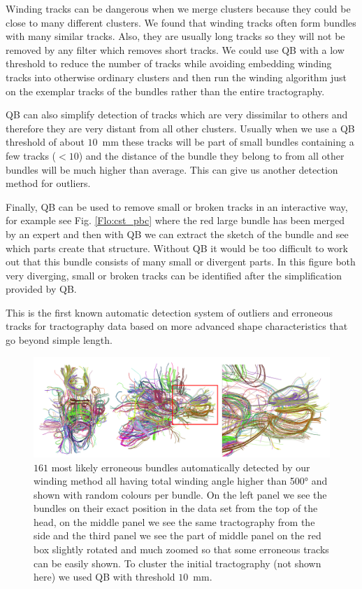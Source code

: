 \documentclass[preprint,authoryear,a4paper,10pt,onecolumn]{elsarticle}
\begin{document}
Winding tracks can be dangerous when we merge clusters because they
could be close to many different clusters. We found that winding tracks
often form bundles with many similar tracks. Also, they are usually long
tracks so they will not be removed by any filter which removes short
tracks. We could use QB with a low threshold to reduce the number of
tracks while avoiding embedding winding tracks into otherwise ordinary
clusters and then run the winding algorithm just on the exemplar tracks
of the bundles rather than the entire tractography.

QB can also simplify detection of tracks which are very dissimilar to
others and therefore they are very distant from all other clusters.
Usually when we use a QB threshold of about $10$~mm these tracks will be
part of small bundles containing a few tracks ($<10$) and the distance
of the bundle they belong to from all other bundles will be much higher
than average. This can give us another detection method for outliers.

Finally, QB can be used to remove small or broken tracks in an
interactive way, for example see Fig. \ref{Flo:cst_pbc} where the red
large bundle has been merged by an expert and then with QB we can
extract the sketch of the bundle and see which parts create that
structure. Without QB it would be too difficult to work out that this
bundle consists of many small or divergent parts. In this figure both
very diverging, small or broken tracks can be identified after the
simplification provided by QB.

This is the first known automatic detection system of outliers and
erroneous tracks for tractography data based on more advanced shape
characteristics that go beyond simple length.

\begin{figure}
\begin{centering}
\includegraphics[scale=0.65]{last_figures/erroneous_tracks}
\par\end{centering}
\caption{$161$ most likely erroneous bundles automatically detected by
  our winding method all having total winding angle higher than \ang{500}
  and shown with random colours per bundle. On the left panel we
  see the bundles on their exact position in the data set from the top
  of the head, on the middle panel we see the same tractography from the
  side and the third panel we see the part of middle panel on the red
  box slightly rotated and much zoomed so that some erroneous tracks can
  be easily shown. To cluster the initial tractography (not shown here) we
  used QB with threshold $10$~mm.\label{Flo:erroneous_tracks}}
\end{figure}
\end{document}
